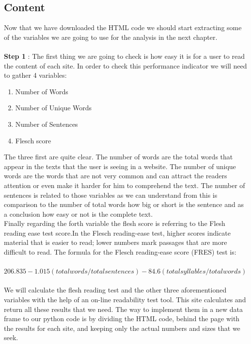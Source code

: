 \documentclass{book}
\begin{document}
\subsection{Content}\label{content}
Now that we have downloaded the HTML code we should start extracting some of the variables we are going to use for the analysis in the next chapter.\\\\
\textbf{Step 1} : The first thing we are going to check is how easy it is for a user to read the content of each site. In order to check this performance indicator we will need to gather 4 variables:
\begin{enumerate}
\item Number of Words
\item Number of Unique Words
\item Number of Sentences
\item Flesch score
\end{enumerate}
The three first are quite clear. The number of words are the total words that appear in the texts that the user is seeing in a website. The number of unique words are the words that are not very common and can attract the readers attention or even make it harder for him to comprehend the text. The number of sentences is related to those variables as we can understand from this is comparison to the number of total words how big or short is the sentence and as a conclusion how easy or not is the complete text.\\
Finally regarding the forth variable the flesh score is referring to the Flesh reading ease test score.In the Flesch reading-ease test, higher scores indicate material that is easier to read; lower numbers mark passages that are more difficult to read. The formula for the Flesch reading-ease score (FRES) test is:\\ \\
$206.835 - 1.015 (total words/total sentences) - 84.6 (total syllables/total words)$\\
\\
We will calculate the flesh reading test and the other three aforementioned variables with the help of an on-line readability test tool.\cite{key34} This site calculates and return all these results that we need. The way to implement them in a new data frame to our python code is by dividing the HTML code, behind the page with the results for each site, and keeping only the actual numbers and sizes that we seek. \\\\
\end{document}
